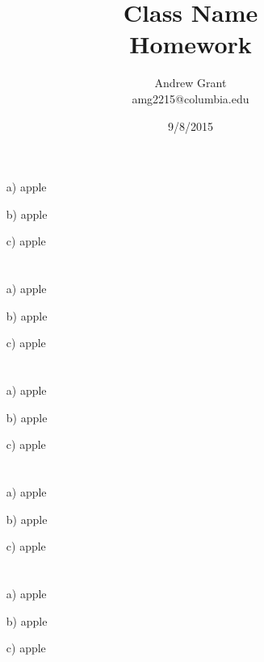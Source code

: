 \documentclass{article}
\title{Class Name\\Homework}
\author{Andrew Grant\\amg2215@columbia.edu}
\date{9/8/2015}
\begin{document}
\maketitle

\section{}
\begin{enumerate}
\item[a)] apple
\item[b)] apple
\item[c)] apple
\end{enumerate}

\section{}
\begin{enumerate}
\item[a)] apple
\item[b)] apple
\item[c)] apple
\end{enumerate}


\section{}
\begin{enumerate}
\item[a)] apple
\item[b)] apple
\item[c)] apple
\end{enumerate}


\section{}
\begin{enumerate}
\item[a)] apple
\item[b)] apple
\item[c)] apple
\end{enumerate}


\section{}
\begin{enumerate}
\item[a)] apple
\item[b)] apple
\item[c)] apple
\end{enumerate}
\end{document}
